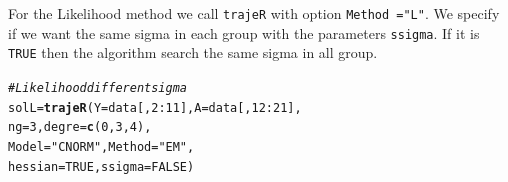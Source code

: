 \documentclass{article}\usepackage[]{graphicx}\usepackage[]{color}
\makeatletter
\newcommand{\hlnum}[1]{\textcolor[rgb]{0.686,0.059,0.569}{#1}}%
\newcommand{\hlstr}[1]{\textcolor[rgb]{0.192,0.494,0.8}{#1}}%
\newcommand{\hlcom}[1]{\textcolor[rgb]{0.678,0.584,0.686}{\textit{#1}}}%
\newcommand{\hlopt}[1]{\textcolor[rgb]{0,0,0}{#1}}%
\newcommand{\hlstd}[1]{\textcolor[rgb]{0.345,0.345,0.345}{#1}}%
\newcommand{\hlkwb}[1]{\textcolor[rgb]{0.69,0.353,0.396}{#1}}%
\newcommand{\hlkwc}[1]{\textcolor[rgb]{0.333,0.667,0.333}{#1}}%
\newcommand{\hlkwd}[1]{\textcolor[rgb]{0.737,0.353,0.396}{\textbf{#1}}}%
\newenvironment{kframe}{%
 \def\at@end@of@kframe{}%
 \ifinner\ifhmode%
  \def\at@end@of@kframe{\end{minipage}}%
  \begin{minipage}{\columnwidth}%
 \fi\fi%
 \def\FrameCommand##1{\hskip\@totalleftmargin \hskip-\fboxsep
 \colorbox{shadecolor}{##1}\hskip-\fboxsep
     \hskip-\linewidth \hskip-\@totalleftmargin \hskip\columnwidth}%
 \MakeFramed {\advance\hsize-\width
   \@totalleftmargin\z@ \linewidth\hsize
   \@setminipage}}%
 {\par\unskip\endMakeFramed%
 \at@end@of@kframe}
\newenvironment{knitrout}{}{} %
\makeatother
\begin{document}
For the Likelihood method we call \verb|trajeR| with option \verb|Method ="L"|. We specify if we want the same sigma in each group with the parameters \verb|ssigma|. If it is \verb|TRUE| then the algorithm search the same sigma in all group.

\begin{knitrout}
\color{fgcolor}\begin{kframe}
\begin{alltt}
\hlcom{# Likelihood different sigma}
\hlstd{solL} \hlkwb{=} \hlkwd{trajeR}\hlstd{(}\hlkwc{Y} \hlstd{= data[,}\hlnum{2}\hlopt{:}\hlnum{11}\hlstd{],} \hlkwc{A} \hlstd{= data[,}\hlnum{12}\hlopt{:}\hlnum{21}\hlstd{],}
              \hlkwc{ng} \hlstd{=} \hlnum{3}\hlstd{,} \hlkwc{degre} \hlstd{=} \hlkwd{c}\hlstd{(}\hlnum{0}\hlstd{,}\hlnum{3}\hlstd{,}\hlnum{4}\hlstd{),}
              \hlkwc{Model} \hlstd{=} \hlstr{"CNORM"}\hlstd{,} \hlkwc{Method} \hlstd{=} \hlstr{"EM"}\hlstd{,}
              \hlkwc{hessian} \hlstd{=} \hlnum{TRUE}\hlstd{,} \hlkwc{ssigma} \hlstd{=} \hlnum{FALSE}\hlstd{)}
\end{alltt}
\end{kframe}
\end{knitrout}
\end{document}
